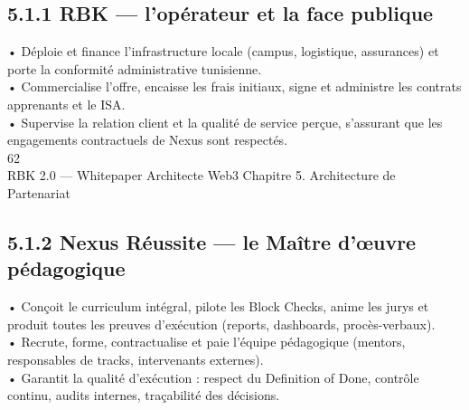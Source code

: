 \subsection{5.1.1 RBK — l’opérateur et la face publique}
• Déploie et finance l’infrastructure locale (campus, logistique, assurances) et porte la conformité administrative tunisienne.\\
• Commercialise l’offre, encaisse les frais initiaux, signe et administre les contrats apprenants et le ISA.\\
• Supervise la relation client et la qualité de service perçue, s’assurant que les engagements contractuels de Nexus sont respectés.\\
\vspace{0.5em}
\vspace{0.5em}
\vspace{0.5em}
\vspace{0.5em}
62\\
RBK 2.0 — Whitepaper Architecte Web3                                                                                          Chapitre 5. Architecture de Partenariat\\
\vspace{0.5em}
\vspace{0.5em}
\subsection{5.1.2 Nexus Réussite — le Maître d’œuvre pédagogique}
• Conçoit le curriculum intégral, pilote les Block Checks, anime les jurys et produit toutes les preuves d’exécution (reports, dashboards, procès-verbaux).\\
• Recrute, forme, contractualise et paie l’équipe pédagogique (mentors, responsables de tracks, intervenants externes).\\
• Garantit la qualité d’exécution : respect du Definition of Done, contrôle continu, audits internes, traçabilité des décisions.\\
\vspace{0.5em}
\vspace{0.5em}
